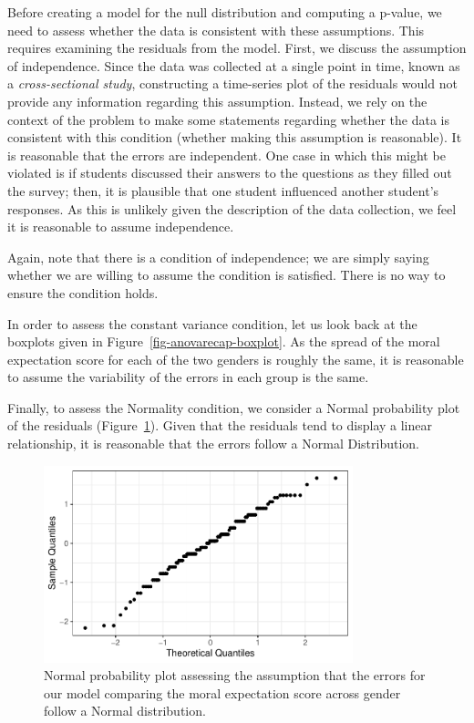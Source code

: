 \documentclass[
  letterpaper,
  DIV=11,
  numbers=noendperiod]{scrreprt}
\theoremstyle{plain}
\theoremstyle{definition}
\theoremstyle{definition}
\theoremstyle{remark}
\begin{document}
Before creating a model for the null distribution and computing a
p-value, we need to assess whether the data is consistent with these
assumptions. This requires examining the residuals from the model.
First, we discuss the assumption of independence. Since the data was
collected at a single point in time, known as a \emph{cross-sectional
study}, constructing a time-series plot of the residuals would not
provide any information regarding this assumption. Instead, we rely on
the context of the problem to make some statements regarding whether the
data is consistent with this condition (whether making this assumption
is reasonable). It is reasonable that the errors are independent. One
case in which this might be violated is if students discussed their
answers to the questions as they filled out the survey; then, it is
plausible that one student influenced another student's responses. As
this is unlikely given the description of the data collection, we feel
it is reasonable to assume independence.

Again, note that there is a condition of independence; we are simply
saying whether we are willing to assume the condition is satisfied.
There is no way to ensure the condition holds.

In order to assess the constant variance condition, let us look back at
the boxplots given in Figure~\ref{fig-anovarecap-boxplot}. As the spread
of the moral expectation score for each of the two genders is roughly
the same, it is reasonable to assume the variability of the errors in
each group is the same.

Finally, to assess the Normality condition, we consider a Normal
probability plot of the residuals
(Figure~\ref{fig-anovarecap-resids-probplot}). Given that the residuals
tend to display a linear relationship, it is reasonable that the errors
follow a Normal Distribution.

\begin{figure}

{\centering \includegraphics[width=0.8\textwidth,height=\textheight]{./images/fig-anovarecap-resids-probplot-1.pdf}

}

\caption{\label{fig-anovarecap-resids-probplot}Normal probability plot
assessing the assumption that the errors for our model comparing the
moral expectation score across gender follow a Normal distribution.}

\end{figure}
\end{document}
